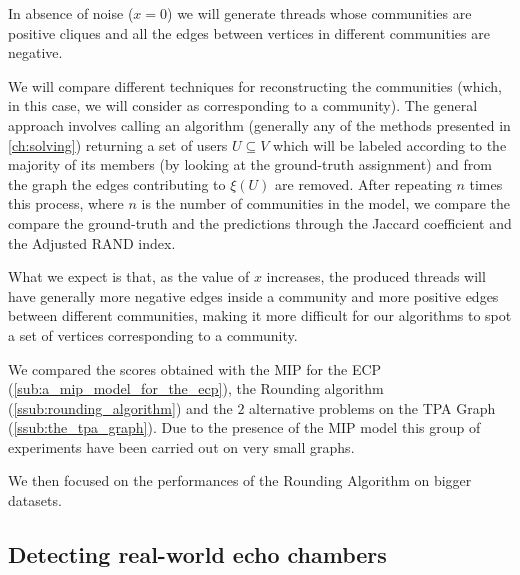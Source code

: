 In absence of noise ($x = 0$) we will generate threads whose communities are
positive cliques and all the edges between vertices in different communities
are negative.

We will compare different techniques for reconstructing the communities (which,
in this case, we will consider as corresponding to a community). The
general approach involves calling an algorithm (generally any of the methods
presented in \autoref{ch:solving}) returning a set of users $U
	\subseteq V$ which will be labeled according to the majority of its members
(by looking at the ground-truth assignment) and from the graph the edges
contributing to $\xi(U)$ are removed.
After repeating $n$ times this process, where
$n$ is the number of communities in the model, we compare the
compare the ground-truth and the predictions through the Jaccard coefficient and the Adjusted
RAND index\footnotemark.


What we expect is that, as the value of $x$ increases, the produced threads
will have generally more negative edges inside a community and more positive
edges between different communities, making it more difficult for our
algorithms to spot a set of vertices corresponding to a community.

We compared the scores obtained with the \acrshort{MIP} for the \acrshort{ECP}
(\autoref{sub:a_mip_model_for_the_ecp}), the Rounding algorithm
(\autoref{ssub:rounding_algorithm}) and the $2$ alternative problems on the
\acrshort{TPA} Graph (\autoref{ssub:the_tpa_graph}). Due to the presence of the
\acrshort{MIP} model this group of experiments have been carried out on very
small graphs. %

We then focused on the performances of the Rounding Algorithm on bigger
datasets.


\subsection{Detecting real-world echo chambers}%
\label{sub:detecting_real_echo_chambers}

